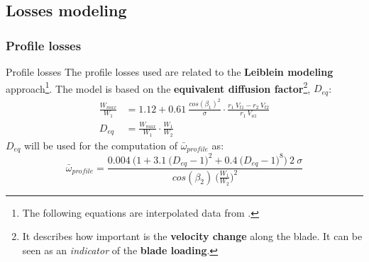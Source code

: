 \subsection{Losses modeling} \label{lossesModeling}
\subsubsection{Profile losses}
	{\nologo
	\begin{frame}{Profile losses}
		The profile losses used are related to the \textbf{Leiblein modeling} approach\footnote{The following equations are interpolated data from \cite[Sec. 6.4]{axial2004}.}.
		\newline
		The model is based on the \textbf{equivalent diffusion factor}\footnote{It describes how important is the \textbf{velocity change} along the blade. It can be seen as an \textit{indicator} of the \textbf{blade loading}.}, $D_{eq}$:
		\begin{align}
			\frac{W_{max}}{W_1} & = 1.12 + 0.61 \ \frac{cos(\beta_1)^2}{\sigma} \cdot \frac{r_1 \ V_{t1} - r_2 \ V_{t2}}{r_1 \ V_{a1}} \nonumber \\
			D_{eq} & = \frac{W_{max}}{W_1} \cdot \frac{W_1}{W_2} \nonumber  
		\end{align}
		$D_{eq}$ will be used for the computation of $\bar{\omega}_{profile}$ as:
		\begin{equation}
			\bar{\omega}_{profile} = \frac{0.004 \ \Big( 1 + 3.1 \ \big( D_{eq} - 1 \big)^2 + 0.4 \ \big( D_{eq} - 1 \big)^8 \Big) \ 2 \ \sigma}{cos(\beta_2) \ \Big( \frac{W_1}{W_2} \Big)^2} \nonumber
		\end{equation}
	\end{frame}
	}

